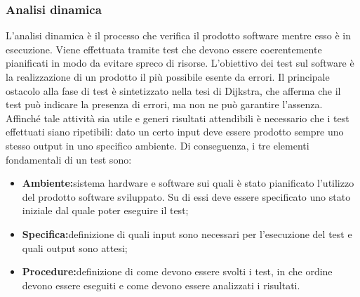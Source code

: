 \subsubsection{Analisi dinamica}
    L'analisi dinamica è il processo che verifica il prodotto software mentre esso è in esecuzione. Viene effettuata tramite test che devono essere coerentemente pianificati in modo da evitare spreco di risorse.
    L'obiettivo dei test sul software è la realizzazione di un prodotto il più possibile esente da errori. Il principale ostacolo alla fase di test è sintetizzato nella tesi di Dijkstra, che afferma che il test può indicare la presenza di errori, ma non ne può garantire l'assenza.
Affinché tale attività sia utile e generi risultati attendibili è necessario che i test effettuati
siano ripetibili: dato un certo input deve essere prodotto sempre uno stesso output in
uno specifico ambiente. Di conseguenza, i tre elementi fondamentali di un test sono:
    \begin{itemize}
    \item \textbf{Ambiente:}sistema hardware e software sui quali è stato pianificato l'utilizzo del
prodotto software sviluppato. Su di essi deve essere specificato uno stato iniziale
dal quale poter eseguire il test;
    \item \textbf{Specifica:}definizione di quali input sono necessari per l'esecuzione del test e quali output sono attesi;
    \item \textbf{Procedure:}definizione di come devono essere svolti i test, in che ordine devono
essere eseguiti e come devono essere analizzati i risultati.
    \end{itemize}


